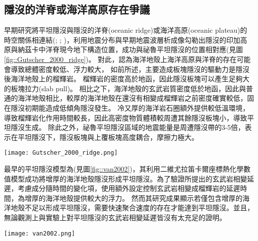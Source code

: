 \subsection{隱沒的洋脊或海洋高原存在爭議}
早期研究將平坦隱沒與隱沒的洋脊(oceanic ridge)或海洋高原(oceanic plateau)的時空關係相連結(\citealp{pilger1981plate}; \citealp{henderson1984mesozoic}; \citealp{Gutscher2000A})，\citealp{Gutscher2000A}利用地震分布與早期地震波層析成像勾勒出隱沒的印加高原與納茲卡中洋脊現今地下構造位置，成功與祕魯平坦隱沒的位置相對應(見圖\ref{fig::Gutscher_2000_ridge})。
對此，\citealp{Gutscher2000A}認為海洋地殼上海洋高原與洋脊的存在可能會導致總體密度較低、浮力較大，
如前所述，主要造成板塊隱沒的驅動力是隱沒後海洋地殼上的榴輝岩。
榴輝岩的密度高於地函，因此隱沒板塊可以產生足夠大的板塊拉力(slab pull)。
相比之下，海洋地殼的玄武岩質密度低於地函，因此與普通的海洋地殼相比，較厚的海洋地殼在還沒有相變成榴輝岩之前密度確實較低，固在隱沒初期能造成低傾角隱沒發生。
冷又厚的海洋岩石圈額外提供較低溫環境，導致榴輝岩化作用時間較長，因此高密度物質體積較周遭其餘隱沒板塊小，導致平坦隱沒生成。
除此之外，祕魯平坦隱沒區域的地震能量是周遭隱沒帶的3-5倍，表示在平坦隱沒下，隱沒板塊與上覆板塊高度耦合，摩擦力極大。
\begin{figure*}[ht!]
    \centering
    \texttt{[image: Gutscher\_2000\_ridge.png]}
    \caption{南美洲板塊構造圖，摘自\citealp{Gutscher2000A}。粗支架線標出平坦隱沒段，灰色陰影區標示隱沒的海洋高原與洋脊，三角形為活動火山。板塊聚合速率參考自\citealp{demets1990current}。
    }
    \label{fig::Gutscher_2000_ridge}
\end{figure*}

最早的平坦隱沒模型為\citealp{van2002role}(見圖\ref{fig::van2002})，其利用二維尤拉笛卡爾座標熱化學數值模型成功將增厚的海洋地殼隱沒形成平坦隱沒。為了驗證\citealp{Gutscher2000A}所提出的玄武岩相變延遲，\citealp{van2002role}考慮成分隨時間的變化項，使用額外設定控制玄武岩相變成榴輝岩的延遲時間，為增厚的海洋地殼提供較大的浮力。
然而其研究成果顯示若僅包含增厚的海洋地殼不足以形成平坦隱沒，需要快速聚合速度的存在才能達到平坦隱沒。並且，無論觀測上與實驗上對平坦隱沒的玄武岩相變延遲皆沒有太充足的證明。

\begin{figure*}[ht!]
    \centering
    \texttt{[image: van2002.png]}
    \caption{正常的隱沒帶(左)與包含海洋高原的隱沒帶(右)隨模型時間變化，摘自\citealp{van2002role}。黑白區域繪出海洋地殼的化學成分從玄武岩(黑)到榴輝岩(白)的變化。水平軸為與海溝的距離，背景顏色為溫度。
    }
    \label{fig::van2002}
\end{figure*}


